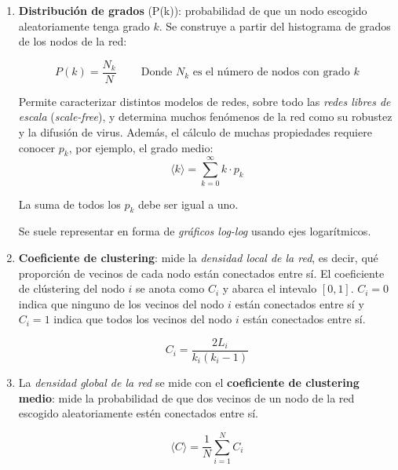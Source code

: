 \documentclass[10pt,spanish, landscape, twocolumn]{article}
\begin{document}
\begin{enumerate}[\color{temados}{$\Diamond$}]
    \item \textbf{\textcolor{temados}{Distribución de grados}} (P(k)): probabilidad de que un nodo escogido aleatoriamente tenga grado $k$. Se construye a partir del histograma de grados de los nodos de la red:

    \begin{displaymath}
        P(k) = \frac{N_k}{N} \qquad\ \textrm{Donde $N_k$ es el número de nodos con grado $k$}
    \end{displaymath}

    Permite caracterizar distintos modelos de redes, sobre todo las \textit{\textcolor{temados}{redes libres de escala}} (\textit{\textcolor{temados}{scale-free}}), y determina muchos fenómenos de la red como su robustez y la difusión de virus. Además, el cálculo de muchas propiedades requiere conocer $p_k$, por ejemplo, el grado medio:
    \begin{displaymath}
        \langle k \rangle = \sum_{k=0}^{\infty} k \cdot p_k
    \end{displaymath}

    La suma de todos los $p_k$ debe ser igual a uno.

    Se suele representar en forma de \textit{\textcolor{temados}{gráficos log-log}} usando ejes logarítmicos.

    \item \textbf{\textcolor{temados}{Coeficiente de clustering}}: mide la \textit{\textcolor{temados}{densidad local de la red}}, es decir, qué proporción de vecinos de cada nodo están conectados entre sí. El coeficiente de clústering del nodo $i$ se anota como $C_i$ y abarca el intevalo $[0,1]$. $C_i = 0$ indica que ninguno de los vecinos del nodo $i$ están conectados entre sí y $C_i = 1$ indica que todos los vecinos del nodo $i$ están conectados entre sí.

    \begin{displaymath}
        C_i = \frac{2 L_i}{k_i (k_i-1)}
    \end{displaymath}

    \item La \textit{\textcolor{temados}{densidad global de la red}} se mide con el \textbf{\textcolor{temados}{coeficiente de clustering medio}}: mide la probabilidad de que dos vecinos de un nodo de la red escogido aleatoriamente estén conectados entre sí.

    \begin{displaymath}
        \langle C \rangle = \frac{1}{N} \sum_{i=1}^N C_i
    \end{displaymath}
\end{enumerate}
\end{document}
